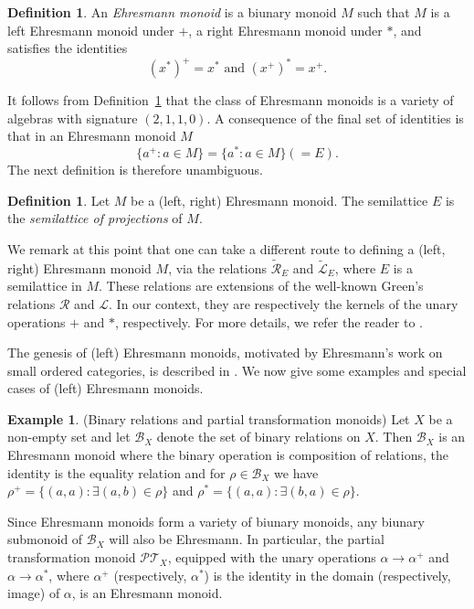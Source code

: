 \documentclass[12pt]{amsart}
\theoremstyle{definition}
\newtheorem{ex}[them]{Example}
\newtheorem{defn}[them]{Definition}
\theoremstyle{definition}
\numberwithin{them}{section}
\numberwithin{equation}{section}
\newcommand{\ar}{\mathcal{R}}
\newcommand{\el}{\mathcal{L}}
\newcommand{\art}{\widetilde{\mathcal{R}}}
\newcommand{\elt}{\widetilde{\mathcal{L}}}
\begin{document}
\begin{defn} \label{defn:ehresmann} An {\em Ehresmann monoid} is a biunary monoid $M$ such that $M$ is a left Ehresmann monoid under  $+$, a right Ehresmann monoid under $*$,    and satisfies the identities
\[(x^*)^+=x^*\mbox{ and }(x^+)^*=x^+.\]
\end{defn}

It follows from Definition~\ref{defn:ehresmann}  that the class of  Ehresmann monoids is a variety of algebras  with signature $(2,1,1,0)$. A consequence of
 the final set of identities is  that in an Ehresmann monoid $M$
\[\{ a^+:a\in M\}=\{ a^*:a\in M\}(=E).\] 
The next definition is therefore  unambiguous.


\begin{defn} \label{defn:proj} Let $M$ be a  (left, right) Ehresmann monoid.  The semilattice $E$ is the {\em semilattice of projections} of $M$. \end{defn} 



We remark at this point that one can take a different route to defining a (left, right) Ehresmann monoid $M$, via the relations $\art_E$ and $\elt_E$, where $E$ is a semilattice in $M$. These relations are extensions of the well-known Green's relations $\ar$ and $\el$. In our context, they are respectively the kernels of the unary operations  $+$ and $*$,  respectively. For more details, we refer the reader to \cite{G}.

 The genesis of (left) Ehresmann monoids, motivated by Ehresmann's work on small ordered categories, is described in \cite{lawson:1991}. We now give some examples and special cases of (left) Ehresmann monoids. 



\begin{ex}\label{ex:relations} (Binary relations and partial transformation monoids)  Let $X$ be a non-empty set and let $\mathcal{B}_X$ denote the set of binary relations on $X$. Then $\mathcal{B}_X$ is an Ehresmann monoid where the binary operation is composition of relations, the identity is the equality relation
and for $\rho\in  \mathcal{B}_X$  we have
$\rho^+=\{ (a,a):\exists (a,b)\in \rho\}$ and $\rho^*=\{ (a,a): \exists (b,a)\in \rho\}$. 

 Since Ehresmann monoids form a variety of biunary monoids, any biunary submonoid of $\mathcal{B}_X$  will also be Ehresmann. In particular, the partial transformation monoid $\mathcal{PT}_X$, equipped with the unary operations $\alpha\rightarrow \alpha^+$ and $\alpha\rightarrow \alpha^*$, where $\alpha^+$ (respectively, $\alpha^*$) is the identity in the domain (respectively, image) of $\alpha$, is  an  Ehresmann monoid.
\end{ex}
\end{document}
